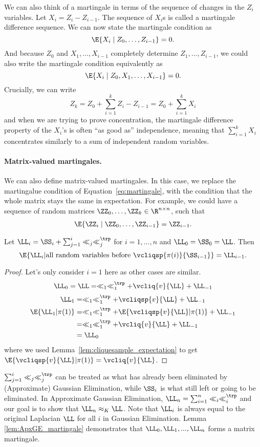 We can also think of a martingale in terms of the sequence of changes
in the $Z_i$ variables.
Let $X_i = Z_i - Z_{i-1}$.
The sequence of $X_i$s is called a martingale difference sequence.
We can now state the martingale condition as
\[
  \E{X_i \mid Z_0, \ldots, Z_{i-1}} = 0
.
\]
And because $Z_0$ and $X_{1}, \ldots, X_{i-1}$ completely determine
$Z_1,  \ldots, Z_{i-1}$, we could also write
the martingale condition equivalently as
\[
  \E{X_i \mid Z_0, X_1, \ldots, X_{i-1}} = 0
  .
\]
Crucially, we can write
\[
Z_k = Z_0 + \sum_{i=1}^k Z_i - Z_{i-1} = Z_0 + \sum_{i=1}^k X_i
\]
and when we are trying to prove concentration, the martingale difference property
of the $X_i$'s is often ``as good as'' independence, meaning that
$\sum_{i=1}^k X_i$ concentrates similarly to a sum of independent
random variables.




\paragraph{Matrix-valued martingales.}
We can also define matrix-valued martingales.
In this case, we replace the martingalue condition of
Equation~\eqref{eq:martingale}, with the condition that the whole matrix
stays the same in expectation.
For example, we could have a sequence of random matrices $\ZZ_0, \ldots,
\ZZ_k \in \R^{n \times n}$, such that
\begin{align}
\label{eq:matmartingale}
  \E{\ZZ_i \mid \ZZ_0, \ldots, \ZZ_{i-1}} = \ZZ_{i-1}
.
\end{align}
\begin{lemma}\label{lem:ApxGE_martingale}
  Let $\LL_i = \SS_i + \sum_{j=1}^i \ll_j\ll_j^\trp$ for $i=1,...,n$ and $\LL_0=\SS_0=\LL$. Then
  \[ \E{\LL_i | \text{all random variables before } \vcliqsp{\pi(i)}{\SS_{i-1}} } = \LL_{i-1}. \]
\end{lemma}
\begin{proof}
  Let's only consider $i=1$ here as other cases are similar.
  \[ \LL_0 = \LL = \ll_1\ll_1^\trp + \vcliq{v}{\LL} + \LL_{-1} \]
  \begin{align*}
    \LL_1 &= \ll_1\ll_1^\trp + \vcliqsp{v}{\LL} + \LL_{-1} \\
    \E{\LL_1 | \pi(1)}
    &= \ll_1\ll_1^\trp + \E{\vcliqsp{v}{\LL}|\pi(1)} + \LL_{-1} \\
    &= \ll_1\ll_1^\trp + \vcliq{v}{\LL} + \LL_{-1} \\
    &= \LL_0
  \end{align*}
  where we used Lemma~\ref{lem:cliquesample_expectation} to get
  $\E{\vcliqsp{v}{\LL}|\pi(1)}  = \vcliq{v}{\LL} $.
\end{proof}
\begin{remark}
  $\sum_{j=1}^i \ll_j\ll_j^\trp$ can be treated as what has already been eliminated by (Approximate) Gaussian Elimination, while $\SS_i$ is what still left or going to be eliminated.
  In Approximate Gaussian Elimination, $\LL_n=\sum_{i=1}^n\ll_i\ll_i^\trp$ and our goal is to show that $\LL_n\approx_K\LL$.
  Note that $\LL_i$ is always equal to the original Laplacian $\LL$ for all $i$ in Gaussian Elimination.
  Lemma \ref{lem:ApxGE_martingale} demonstrates that $\LL_0,\LL_1,...,\LL_n$ forms a matrix martingale.
\end{remark}

